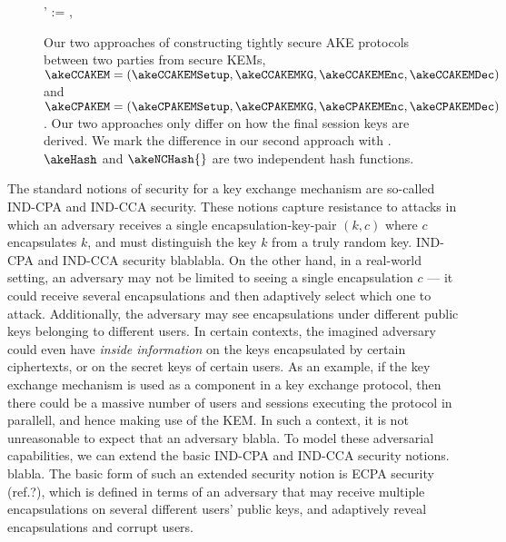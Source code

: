\begin{figure}[t]
\begin{pcimage}
{{				\<\akeCPAkey' := \akeCPAkey,  
			}
		}
	\end{pcimage}
	\caption{Our two approaches of constructing tightly secure AKE protocols between two parties from  secure KEMs, $\akeCCAKEM = (\akeCCAKEMSetup, \akeCCAKEMKG, \akeCCAKEMEnc, \akeCCAKEMDec)$ and $\akeCPAKEM = (\akeCPAKEMSetup, \akeCPAKEMKG, \akeCPAKEMEnc, \akeCPAKEMDec)$. Our two approaches only differ on how the final session keys are derived. We mark the difference in our second approach with . $\akeHash$ and $\akeNCHash{}$ are two independent hash functions.}
	\label{fig:scheme:vis-akescheme}
\end{figure}
\fi


The standard notions of security for a key exchange mechanism are so-called IND-CPA and IND-CCA security.
These notions capture resistance to attacks in which an adversary receives a single
encapsulation-key-pair \((k,c)\) where \(c\) encapsulates \(k\),
and must distinguish the key \(k\) from a truly random key.
IND-CPA and IND-CCA security blablabla.
On the other hand, in a real-world setting,
an adversary may not be limited to seeing a single encapsulation \(c\)
--- it could receive several encapsulations and then adaptively select which one to attack.
Additionally, the adversary may see encapsulations under different public keys belonging to different users.
In certain contexts, the imagined adversary could even have \emph{inside information}
on the keys encapsulated by certain ciphertexts, or on the secret keys of certain users.
As an example, if the key exchange mechanism is used as a component in a key exchange protocol,
then there could be a massive number of users and sessions executing the protocol in parallell,
and hence making use of the KEM.
In such a context, it is not unreasonable to expect that an adversary blabla.
To model these adversarial capabilities,
we can extend the basic IND-CPA and IND-CCA security notions.
blabla.
The basic form of such an extended security notion is ECPA security (ref.?),
which is defined in terms of an adversary that may receive multiple encapsulations
on several different users' public keys, and adaptively reveal encapsulations and corrupt users.


